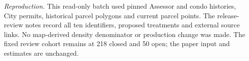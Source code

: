 \medskip
\noindent\textit{Reproduction.} This read-only batch used pinned Assessor and condo histories, City permits, historical parcel polygons and current parcel points. The release-review notes record all ten identifiers, proposed treatments and external source links. No map-derived density denominator or production change was made. The fixed review cohort remains at 218 closed and 50 open; the paper input and estimates are unchanged.
